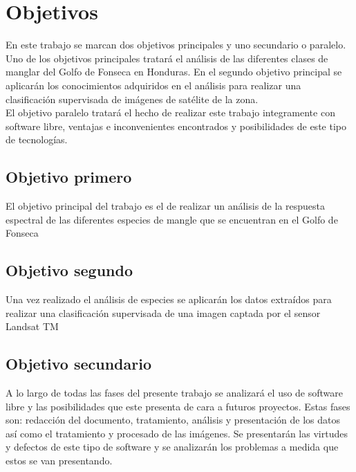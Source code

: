 


\chapter{Objetivos}
En este trabajo se marcan dos objetivos principales y uno secundario o paralelo. Uno de los objetivos principales tratará el análisis de las diferentes clases de manglar del Golfo de Fonseca en Honduras. En el segundo objetivo principal se aplicarán los conocimientos adquiridos en el análisis para realizar una clasificación supervisada de imágenes de satélite de la zona.\\

El objetivo paralelo tratará el hecho de realizar este trabajo integramente con software libre, ventajas e inconvenientes encontrados y posibilidades de este tipo de tecnologías.

\section{Objetivo primero}
El objetivo principal del trabajo es el de realizar un análisis de la respuesta espectral de las diferentes especies de mangle que se encuentran en el Golfo de Fonseca

\section{Objetivo segundo}
Una vez realizado el análisis de especies se aplicarán los datos extraídos para realizar una clasificación supervisada de una imagen captada por el sensor Landsat TM

\section{Objetivo secundario}
A lo largo de todas las fases del presente trabajo se analizará el uso de software libre y las posibilidades que este presenta de cara a futuros proyectos. Estas fases son: redacción del documento, tratamiento, análisis y presentación de los datos así como el tratamiento y procesado de las imágenes. Se presentarán las virtudes y defectos de este tipo de software y se analizarán los problemas a medida que estos se van presentando.